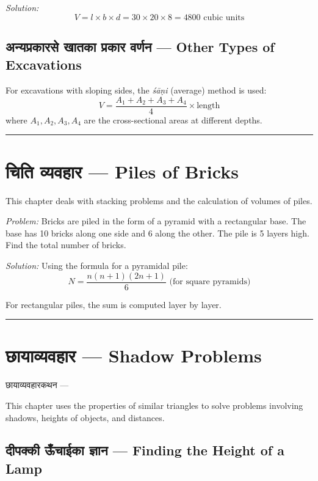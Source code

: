 \documentclass[11pt,a4paper]{book}
\newcommand{\longline}{\noindent\rule{\textwidth}{0.4pt}}
\newenvironment{sanskritverse}{
  \begin{center}
  \begin{minipage}{0.92\textwidth}
  \devanagarifont
  \centering
}{
  \end{minipage}
  \end{center}
  \vspace{0.5em}
}
\begin{document}
\textit{Solution:}
\[
V = l \times b \times d = 30 \times 20 \times 8 = 4800 \text{ cubic units}
\]

\section{अन्यप्रकारसे खातका प्रकार वर्णन — Other Types of Excavations}

For excavations with sloping sides, the \textit{śāṇi} (average) method is used:
\[
V = \frac{A_1 + A_2 + A_3 + A_4}{4} \times \text{length}
\]
where $A_1, A_2, A_3, A_4$ are the cross-sectional areas at different depths.

\longline

\chapter{चिति व्यवहार — Piles of Bricks}
\label{chap:citi}

This chapter deals with stacking problems and the calculation of volumes of piles.

\textit{Problem:} Bricks are piled in the form of a pyramid with a rectangular base. The base has 10 bricks along one side and 6 along the other. The pile is 5 layers high. Find the total number of bricks.

\textit{Solution:} Using the formula for a pyramidal pile:
\[
N = \frac{n(n+1)(2n+1)}{6} \text{ (for square pyramids)}
\]

For rectangular piles, the sum is computed layer by layer.

\longline

\chapter{छायाव्यवहार — Shadow Problems}
\label{chap:chaya}

\begin{sanskritverse}
छायाव्यवहारकथन —
\end{sanskritverse}

This chapter uses the properties of similar triangles to solve problems involving shadows, heights of objects, and distances.

\section{दीपक्की ऊँचाईका ज्ञान — Finding the Height of a Lamp}
\end{document}
